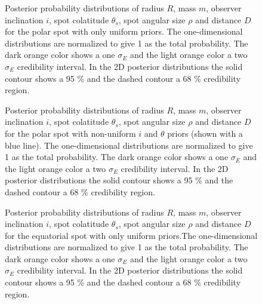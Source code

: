 \documentclass{wihuri}
\begin{document}
\begin{figure}
\centerline{}
\caption{Posterior probability distributions of radius $R$, mass $m$, observer inclination $i$, spot colatitude $\theta_{s}$, spot angular size $\rho$ and distance $D$ for the polar spot with only uniform priors. The one-dimensional distributions are normalized to give 1 as the total probability. The dark orange color shows a one $\sigma_{E}$ and the light orange color a two $\sigma_{E}$ credibility interval. In the 2D posterior distributions the solid contour shows a 95 \% and the dashed contour a 68 \% credibility region.  
\label{fig:polpost}}
\end{figure}

\begin{figure}
\centerline{}
\caption{Posterior probability distributions of radius $R$, mass $m$, observer inclination $i$, spot colatitude $\theta_{s}$, spot angular size $\rho$ and distance $D$ for the polar spot with non-uniform $i$ and $\theta$ priors (shown with a blue line). The one-dimensional distributions are normalized to give 1 as the total probability. The dark orange color shows a one $\sigma_{E}$ and the light orange color a two $\sigma_{E}$ credibility interval. In the 2D posterior distributions the solid contour shows a 95 \% and the dashed contour a 68 \% credibility region.
\label{fig:polpostpr}}
\end{figure}



\begin{figure}
\centerline{}
\caption{Posterior probability distributions of radius $R$, mass $m$, observer inclination $i$, spot colatitude $\theta_{s}$, spot angular size $\rho$ and distance $D$ for the equatorial spot with only uniform priors.The one-dimensional distributions are normalized to give 1 as the total probability. The dark orange color shows a one $\sigma_{E}$ and the light orange color a two $\sigma_{E}$ credibility interval. In the 2D posterior distributions the solid contour shows a 95 \% and the dashed contour a 68 \% credibility region.
\label{fig:eqpost}}
\end{figure}
\end{document}
